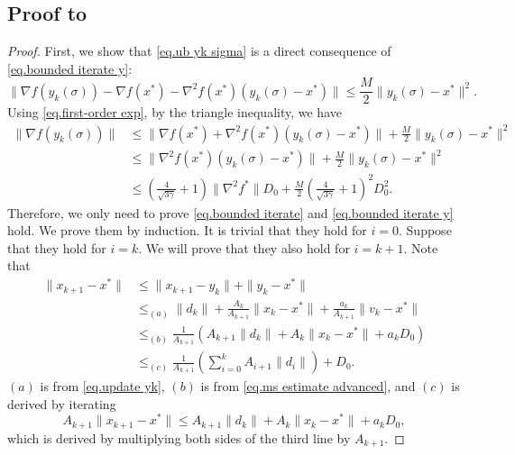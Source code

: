 \documentclass{article}
\begin{document}
\subsection*{Proof to }
\begin{proof}
    First, we show that \eqref{eq.ub yk sigma} is a direct consequence of \eqref{eq.bounded iterate y}:
    \begin{equation*}
        \|\nabla f(y_k(\sigma)) - \nabla f(x^*) -\nabla^2 f(x^*)(y_k(\sigma)-x^*)\| \leq \frac{M}{2}\|y_k(\sigma)-x^*\|^2.
    \end{equation*}
    Using \eqref{eq.first-order exp}, by the triangle inequality, we have
    \begin{equation*}
        \begin{aligned}
            \|\nabla f(y_k(\sigma)) \| & \leq \|\nabla f(x^*)+\nabla^2 f(x^*)(y_k(\sigma)-x^*)\| +\frac{M}{2}\|y_k(\sigma)-x^*\|^2                                    \\
                                       & \leq \|\nabla^2 f(x^*)(y_k(\sigma)-x^*)\|+\frac{M}{2}\|y_k(\sigma)-x^*\|^2                                                   \\
                                       & \leq \left(\frac{4}{\sqrt{3\gamma}}+1\right)\|\nabla ^2 f^*\|D_0+\frac{M}{2}\left(\frac{4}{\sqrt{3\gamma}}+1\right)^2 D_0^2.
        \end{aligned}
    \end{equation*}
    Therefore, we only need to prove \eqref{eq.bounded iterate} and \eqref{eq.bounded iterate y} hold. We prove them by induction. It is trivial that they hold for $i=0$. Suppose that they hold for $i=k$. We will prove that they also hold for $i=k+1$. Note that
    \begin{equation*}
        \begin{aligned}
            \|x_{k+1}-x^*\| & \leq \|x_{k+1}-y_k\| + \|y_k-x^*\|                                            \\
                            & \leq_{(a)} \|d_k\|+ \frac{A_k}{A_{k+1}} \|x_k-x^*\| +\frac{a_k}{A_{k+1}}\|v_k-x^*\| \\
                            & \leq_{(b)} \frac{1}{A_{k+1}}\left(A_{k+1}\|d_k\| +A_k\|x_k-x^*\| +  a_k D_0\right)  \\
                            & \leq_{(c)} \frac{1}{A_{k+1}}\left (\sum_{i=0}^k A_{i+1}\|d_i\|\right)+D_0.
        \end{aligned}
    \end{equation*}
    $(a)$ is from \eqref{eq.update yk}, $(b)$ is from \eqref{eq.ms estimate advanced}, and $(c)$ is derived by iterating
    \begin{equation*}
        A_{k+1} \|x_{k+1}-x^*\|\leq A_{k+1}\|d_k\|+A_k\|x_k-x^*\|+a_k D_0,
    \end{equation*}
    which is derived by multiplying both sides of the third line by $A_{k+1}$.


\end{proof}
\end{document}
